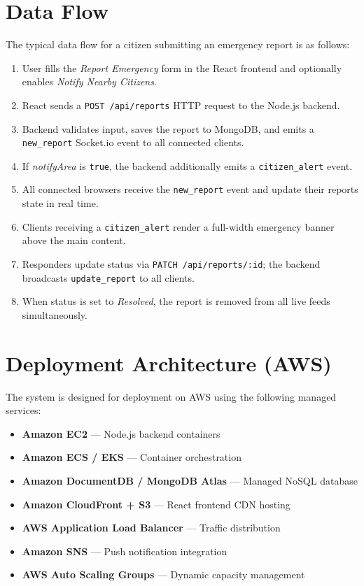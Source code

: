 \documentclass[12pt, a4paper]{report}
\begin{document}
\section{Data Flow}

The typical data flow for a citizen submitting an emergency report is as follows:

\begin{enumerate}
  \item User fills the \textit{Report Emergency} form in the React frontend and optionally enables \textit{Notify Nearby Citizens}.
  \item React sends a \texttt{POST /api/reports} HTTP request to the Node.js backend.
  \item Backend validates input, saves the report to MongoDB, and emits a \texttt{new\_report} Socket.io event to all connected clients.
  \item If \textit{notifyArea} is \texttt{true}, the backend additionally emits a \texttt{citizen\_alert} event.
  \item All connected browsers receive the \texttt{new\_report} event and update their reports state in real time.
  \item Clients receiving a \texttt{citizen\_alert} render a full-width emergency banner above the main content.
  \item Responders update status via \texttt{PATCH /api/reports/:id}; the backend broadcasts \texttt{update\_report} to all clients.
  \item When status is set to \textit{Resolved}, the report is removed from all live feeds simultaneously.
\end{enumerate}

\section{Deployment Architecture (AWS)}

\begin{infobox}
  The system is designed for deployment on AWS using the following managed services:
  \begin{itemize}[noitemsep]
    \item \textbf{Amazon EC2} --- Node.js backend containers
    \item \textbf{Amazon ECS / EKS} --- Container orchestration
    \item \textbf{Amazon DocumentDB / MongoDB Atlas} --- Managed NoSQL database
    \item \textbf{Amazon CloudFront + S3} --- React frontend CDN hosting
    \item \textbf{AWS Application Load Balancer} --- Traffic distribution
    \item \textbf{Amazon SNS} --- Push notification integration
    \item \textbf{AWS Auto Scaling Groups} --- Dynamic capacity management
  \end{itemize}
\end{infobox}
\end{document}

